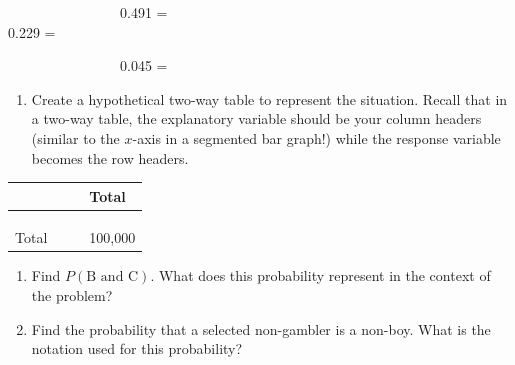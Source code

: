 \documentclass[
]{report}
\providecommand{\tightlist}{%
  \setlength{\itemsep}{0pt}\setlength{\parskip}{0pt}}
\begin{document}
~~~~~~~~~~~~~~~~0.491 = \vspace{.1in}\\
\hspace*{0.333em}\hspace*{0.333em}\hspace*{0.333em}\hspace*{0.333em}\hspace*{0.333em}\hspace*{0.333em}\hspace*{0.333em}\hspace*{0.333em}\hspace*{0.333em}\hspace*{0.333em}\hspace*{0.333em}\hspace*{0.333em}\hspace*{0.333em}\hspace*{0.333em}\hspace*{0.333em}\hspace*{0.333em}0.229 =

\vspace{.1in}

~~~~~~~~~~~~~~~~0.045 =

\vspace{.1in}

\begin{enumerate}
\def\labelenumi{\alph{enumi}.}
\setcounter{enumi}{2}
\tightlist
\item
  Create a hypothetical two-way table to represent the situation. Recall that in a two-way table, the explanatory variable should be your column headers (similar to the \(x\)-axis in a segmented bar graph!) while the response variable becomes the row headers.
\end{enumerate}

\begin{longtable}[]{@{}llll@{}}
\toprule
\hspace{1in} & \hspace{1in} & \hspace{1in} & Total\tabularnewline
\midrule
\endhead
\hspace{1in} & & &\tabularnewline
\hspace{1in} & & &\tabularnewline
\hspace{1in} & & &\tabularnewline
Total & & & 100,000\tabularnewline
\bottomrule
\end{longtable}

\begin{enumerate}
\def\labelenumi{\alph{enumi}.}
\setcounter{enumi}{3}
\item
  Find \(P(\mbox{B and C})\). What does this probability represent in the context of the problem?
  \vspace{.8in}
\item
  Find the probability that a selected non-gambler is a non-boy. What is the notation used for this probability?
\end{enumerate}
\end{document}
